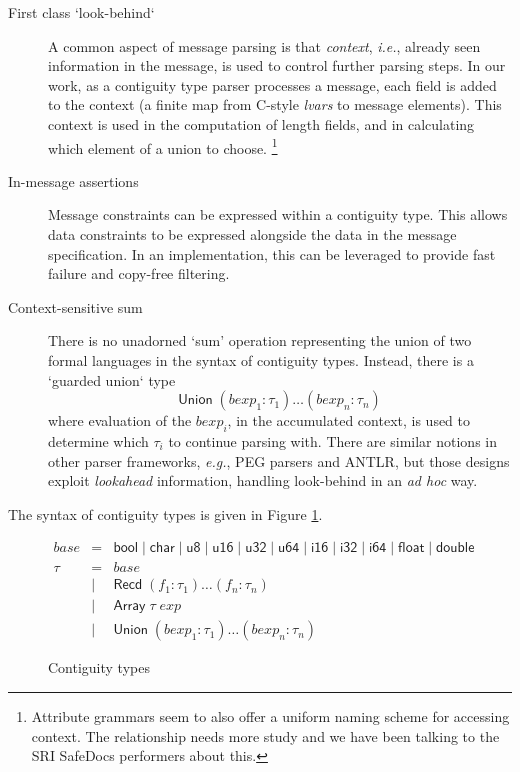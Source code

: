 \documentclass{article}
\newcommand{\ie}{\textit{i.e.}}
\newcommand{\eg}{\textit{e.g.}}
\newcommand{\adhoc}{\textit{ad hoc}}
\newcommand{\konst}[1]{\ensuremath{\mathsf{#1}}}
\begin{document}
\begin{description}

\item [First class `look-behind`] A common aspect of message parsing
  is that \emph{context}, \ie, already seen information in the
  message, is used to control further parsing steps. In our work, as a
  contiguity type parser processes a message, each field is added to
  the context (a finite map from C-style \emph{lvars} to message
  elements). This context is used in the computation of length fields,
  and in calculating which element of a union to
  choose. \footnote{Attribute grammars seem to also offer a uniform
    naming scheme for accessing context. The relationship needs more
    study and we have been talking to the SRI SafeDocs performers
    about this.}

\item [In-message assertions] Message constraints can be expressed
  within a contiguity type. This allows data constraints to be
  expressed alongside the data in the message specification. In an
  implementation, this can be leveraged to provide fast failure and
  copy-free filtering.

\item [Context-sensitive sum] There is no unadorned `sum' operation
  representing the union of two formal languages in the syntax of
  contiguity types. Instead, there is a `guarded union` type
  \[
    \konst{Union}\; (\mathit{bexp}_1 : \tau_1) \ldots (\mathit{bexp}_n : \tau_n)
  \]
  where evaluation of the $\mathit{bexp}_i$, in the accumulated
  context, is used to determine which $\tau_i$ to continue parsing
  with. There are similar notions in other parser frameworks, \eg, PEG
  parsers and ANTLR, but those designs exploit \emph{lookahead}
  information, handling look-behind in an \adhoc{} way.

\end{description}

The syntax of contiguity types is given in Figure \ref{ctypes}.

\begin{figure}
\[
\begin{array}{rcl}
 \mathit{base} & = & \konst{bool} \mid \konst{char} \mid \konst{u8} \mid
 \konst{u16} \mid \konst{u32} \mid \konst{u64}  \mid \konst{i16} \mid
 \konst{i32} \mid \konst{i64} \mid \konst{float} \mid \konst{double} \\
 \tau & = & \mathit{base} \\
      & \mid & \konst{Recd}\; (f_1 : \tau_1) \ldots (f_n : \tau_n) \\
      & \mid & \konst{Array}\; \tau \; \mathit{exp} \\
      & \mid & \konst{Union}\; (\mathit{bexp}_1 : \tau_1) \ldots (\mathit{bexp}_n : \tau_n)
\end{array}
\]
\caption{Contiguity types}
\label{ctypes}
\end{figure}
\end{document}
